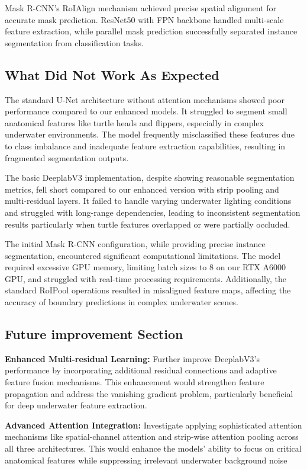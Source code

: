 \documentclass[conference]{IEEEtran}
\begin{document}
Mask R-CNN's RoIAlign mechanism achieved precise spatial alignment for accurate mask prediction. ResNet50 with FPN backbone handled multi-scale feature extraction, while parallel mask prediction successfully separated instance segmentation from classification tasks.
\subsection{What Did Not Work As Expected}
The standard U-Net architecture without attention mechanisms showed poor performance compared to our enhanced models. It struggled to segment small anatomical features like turtle heads and flippers, especially in complex underwater environments. The model frequently misclassified these features due to class imbalance and inadequate feature extraction capabilities, resulting in fragmented segmentation outputs.

The basic DeeplabV3 implementation, despite showing reasonable segmentation metrics, fell short compared to our enhanced version with strip pooling and multi-residual layers. It failed to handle varying underwater lighting conditions and struggled with long-range dependencies, leading to inconsistent segmentation results particularly when turtle features overlapped or were partially occluded.

The initial Mask R-CNN configuration, while providing precise instance segmentation, encountered significant computational limitations. The model required excessive GPU memory, limiting batch sizes to 8 on our RTX A6000 GPU, and struggled with real-time processing requirements. Additionally, the standard RoIPool operations resulted in misaligned feature maps, affecting the accuracy of boundary predictions in complex underwater scenes.
\subsection{Future improvement Section}

\textbf{Enhanced Multi-residual Learning:} Further improve DeeplabV3's performance by incorporating additional residual connections and adaptive feature fusion mechanisms. This enhancement would strengthen feature propagation and address the vanishing gradient problem, particularly beneficial for deep underwater feature extraction.

\textbf{Advanced Attention Integration:} Investigate applying sophisticated attention mechanisms like spatial-channel attention and strip-wise attention pooling across all three architectures. This would enhance the models' ability to focus on critical anatomical features while suppressing irrelevant underwater background noise
\end{document}
